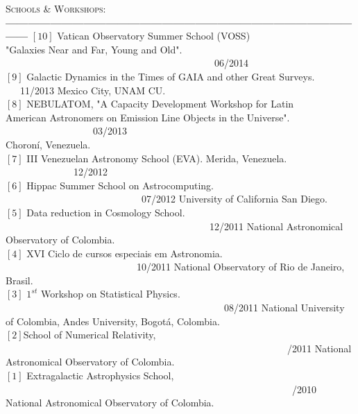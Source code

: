 \documentclass[letterpaper]{article}
\begin{document}
\textsc{\Large Schools \& Workshops:}\\
{\bf---------------------------------------------------------------------------------------------------}
$\left[10\right]$ Vatican Observatory Summer School (VOSS)\\
"Galaxies Near and Far, Young and Old". \indent \ \ \ \  \ \ \  \ \ \  \ \ \  \ \  
 \ \ \ \ \ \ \ \ \ \ \ \ \ \ \ \ \ \ \ \ \ \ \ \ \ \ \ \ 06/2014 \\
$\left[9\right]$ Galactic Dynamics in the Times of GAIA and other Great Surveys. \indent \ \ \ 11/2013
Mexico City, UNAM CU.\\
$\left[8\right]$ \textsc{NEBULATOM}, "A Capacity Development Workshop for Latin\\ 
American Astronomers on Emission Line Objects in the Universe". \indent \ \ \ \ \ \ \ \ \ \ \ \ \ \ \ \ \ \ 03/2013 \\
Choron\'i, Venezuela.  \\
$\left[7\right]$ III Venezuelan Astronomy School (EVA). Merida, Venezuela. \indent \ \ \ \ \ \ \ \ \ \ \ \ \ \ 12/2012\\
$\left[6\right]$ Hippac Summer School on Astrocomputing. \indent \ \ \ \ \ \ \ \ \ \ \ \ \ \ \ \ \ \ \ \ \ \ \ \ \ \ \ \ 07/2012 
University of California San Diego. \\
$\left[5\right]$ Data reduction in Cosmology School.  \indent \ \ \ \ \ \ \ \ \ \ \ \ \ \ \ \ \ \ \ \ \ \ \ \ \ \ \ \ \ \ \ \ \ \ \ \ \ \ \ \ \ \ 12/2011 
National Astronomical Observatory of Colombia.\\
$\left[4\right]$ XVI Ciclo de cursos especiais em Astronomia.  \indent \ \ \ \ \ \ \ \ \ \ \ \ \ \ \ \ \ \ \ \ \ \ \ \ \ \ \ 10/2011
National Observatory of Rio de Janeiro, Brasil. \\
$\left[3\right]$ $1^{st}$ Workshop on Statistical Physics. \indent \ \ \ \ \ \ \ \ \ \ \ \ \ \ \ \ \ \ \ \ \ \ \ \ \ \ \ \ \ \ \ \ \ \ \ \ \ \ \ \ \ \ \ \ \ 08/2011
National University of Colombia, Andes University, Bogot\'{a}, Colombia. \\
$\left[2\right]$School of Numerical Relativity, \indent \ \ \ \ \ \ \ \ \ \ \ \ \ \ \ \ \ \ \ \ \ \ \ \ \ \ \ \ \ \ \ \ \ \ \ \ \ \ \ \ \ \ \ \ \ \ \ \ \ \ \ \ \ \ \ \ \ \ /2011
National Astronomical Observatory of Colombia.\\
$\left[1\right]$ Extragalactic Astrophysics School, \indent \ \ \ \ \ \ \ \ \ \ \ \ \ \ \ \ \ \ \ \ \ \ \ \ \ \ \ \ \ \ \ \ \ \ \ \ \ \ \ \ \ \ \ \ \ \ \ \ \ \ \ \ \ \ \ \ \ \ \ /2010
National Astronomical Observatory of Colombia.\\
\end{document}
